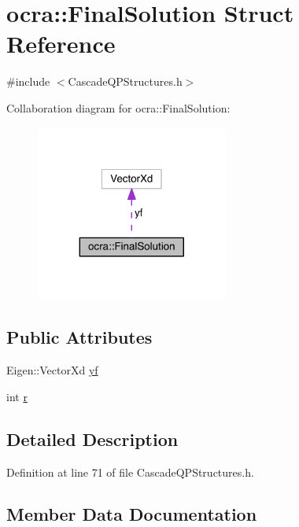 \hypertarget{structocra_1_1FinalSolution}{}\section{ocra\+:\+:Final\+Solution Struct Reference}
\label{structocra_1_1FinalSolution}


{\ttfamily \#include $<$Cascade\+Q\+P\+Structures.\+h$>$}



Collaboration diagram for ocra\+:\+:Final\+Solution\+:\nopagebreak
\begin{figure}[H]
\begin{center}
\leavevmode
\includegraphics[width=179pt]{d8/d2c/structocra_1_1FinalSolution__coll__graph}
\end{center}
\end{figure}
\subsection*{Public Attributes}
\begin{DoxyCompactItemize}
\item 
Eigen\+::\+Vector\+Xd \hyperlink{structocra_1_1FinalSolution_a10e9bf5b4c17125d9f3b8b807c627347}{yf}
\item 
int \hyperlink{structocra_1_1FinalSolution_a5d1585ffcc8f9352521c2607a4c119a3}{r}
\end{DoxyCompactItemize}


\subsection{Detailed Description}


Definition at line 71 of file Cascade\+Q\+P\+Structures.\+h.



\subsection{Member Data Documentation}
\hypertarget{structocra_1_1FinalSolution_a5d1585ffcc8f9352521c2607a4c119a3}{}\label{structocra_1_1FinalSolution_a5d1585ffcc8f9352521c2607a4c119a3} 
